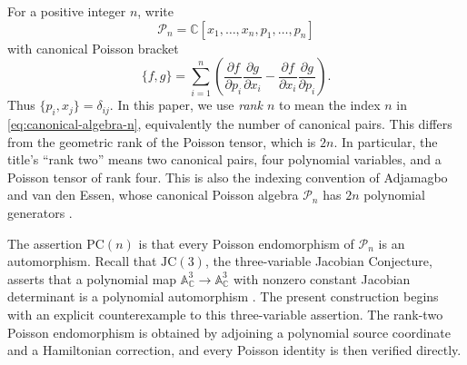 \documentclass[11pt]{article}
\newcommand{\C}{\mathbb C}
\newcommand{\Aff}{\mathbb A}
\newcommand{\Pcal}{\mathcal P}
\newcommand{\PC}{\mathrm{PC}}
\newcommand{\JC}{\mathrm{JC}}
\theoremstyle{remark}
\begin{document}
For a positive integer \(n\), write
\begin{equation}\label{eq:canonical-algebra-n}
  \Pcal_n
  =\C[x_1,\dots,x_n,p_1,\dots,p_n]
\end{equation}
with canonical Poisson bracket
\begin{equation}\label{eq:canonical-bracket-n}
  \{f,g\}
  =\sum_{i=1}^n
   \left(\frac{\partial f}{\partial p_i}
     \frac{\partial g}{\partial x_i}
     -
     \frac{\partial f}{\partial x_i}
     \frac{\partial g}{\partial p_i}
   \right).
\end{equation}
Thus \(\{p_i,x_j\}=\delta_{ij}\).  In this paper, we use \emph{rank \(n\)}
to mean the index \(n\) in \eqref{eq:canonical-algebra-n}, equivalently the
number of canonical pairs.  This differs from the geometric rank of the Poisson
tensor, which is \(2n\).  In particular, the title's ``rank two'' means two
canonical pairs, four polynomial variables, and a Poisson tensor of rank four.
This is also the indexing convention of Adjamagbo and van den Essen, whose
canonical Poisson algebra \(\Pcal_n\) has \(2n\) polynomial generators
\cite[Section~1]{AdjamagboVanDenEssen}.

The assertion \(\PC(n)\) is that every Poisson endomorphism of \(\Pcal_n\) is
an automorphism.  Recall that \(\JC(3)\), the three-variable Jacobian
Conjecture, asserts that a polynomial map \(\Aff^3_\C\to\Aff^3_\C\) with
nonzero constant Jacobian determinant is a polynomial automorphism
\cite{Keller}.  The present construction begins with an explicit
counterexample to this three-variable assertion.  The rank-two Poisson
endomorphism is obtained by adjoining a polynomial source coordinate and a
Hamiltonian correction, and every Poisson identity is then verified directly.
\end{document}
